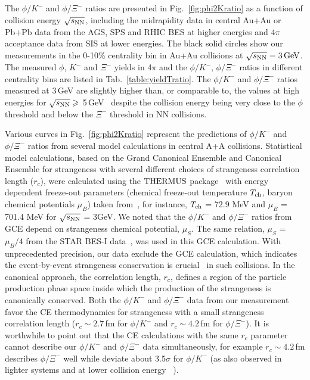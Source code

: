 \documentclass[aps,tightenlines,superscriptaddress,twocolumn]{revtex4-1}
\begin{document}
The $\phi/K^-$ and $\phi/\Xi^-$ ratios are presented in Fig.~\ref{fig:phi2Kratio} as a function of collision energy $\sqrt{s_{\rm NN}}$, including the midrapidity data in central Au+Au or Pb+Pb data from the AGS, SPS and RHIC BES at higher energies and $4\pi$\,acceptance data from SIS at lower energies. The black solid circles show our measurements in the 0-10\% centrality bin in Au+Au collisions at ${\sqrt{s_{\rm NN}} = \rm{3\,GeV}}$. The measured $\phi$, $K^-$ and $\Xi^-$ yields in 4$\pi$ and the $\phi/K^-$, $\phi/\Xi^-$ ratios in different centrality bins are listed in Tab.~\ref{table:yieldTratio}. The $\phi/K^-$ and $\phi/\Xi^-$ ratios measured at 3\,GeV are slightly higher than, or comparable to, the values at high energies for $\sqrt{s_{\rm NN}} \geqslant$ 5\,GeV~\cite{NA49_piK2:2002,E917_phi:2004,NA49_phi:2008,NA49_piK:2008,NA49_Xi:2008,STAR_phi_64a200GeV:2009,Xi_ArKCl_HADES:2009,ALICE_phi_2p7TeV:2015,star_bes_strangeness:2020} despite the collision energy being very close to the $\phi$ threshold and below the $\Xi^-$ threshold in NN collisions. 



Various curves in Fig.~\ref{fig:phi2Kratio} represent the predictions of $\phi/K^-$ and $\phi/\Xi^-$ ratios from several model calculations in central A+A collisions. Statistical model calculations, based on the Grand Canonical Ensemble and Canonical Ensemble for strangeness with several different choices of strangeness correlation length ($r_c$), were calculated using the $\textup{THERMUS}$ package~\cite{THERMUS_WHEATON200984} with energy dependent freeze-out parameters (chemical freeze-out temperature $T_{\rm ch}$, baryon chemical potentials $\mu_B$) taken from~\cite{Andronic_2018Naure}, for instance, $T_{\rm ch}$ = 72.9 MeV and $\mu_B$ = 701.4 MeV for $\sqrt{s_{\rm NN}}$ = 3GeV. 
We noted that the $\phi/K^-$ and $\phi/\Xi^-$ ratios from GCE depend on strangeness chemical potential, $\mu_{S}$. The same relation, $\mu_{S}$ = $\mu_{B}/4$ from the STAR BES-I data~\cite{star_bes_strangeness:2020}, was used in this GCE calculation. 
With unprecedented precision, our data exclude the GCE calculation, 
which indicates the event-by-event strangeness conservation 
is crucial~\cite{BraunMunzinger:2003zd} in such collisions. In the canonical approach, the correlation length, $r_c$, defines a region of the particle production phase space inside which the production of the strangeness is canonically conserved. Both the $\phi/K^-$ and $\phi/\Xi^-$ data from our measurement favor the CE thermodynamics for strangeness with a small strangeness correlation length ($r_c \sim 2.7$\,fm for $\phi/K^-$ and $r_c \sim 4.2$\,fm for $\phi/\Xi^-$). It is worthwhile to point out that the CE calculations with the same $r_c$ parameter cannot describe our $\phi/K^-$ and $\phi/\Xi^-$ data simultaneously, for example $r_c \sim 4.2$\,fm describes $\phi/\Xi^-$ well while deviate about 3.5$\sigma$ for $\phi/K^-$ 
(as also observed in lighter systems and at lower collision energy ~\cite{HADES_phi_ArKCl:2009,Xi_ArKCl_HADES:2009}).
\end{document}
